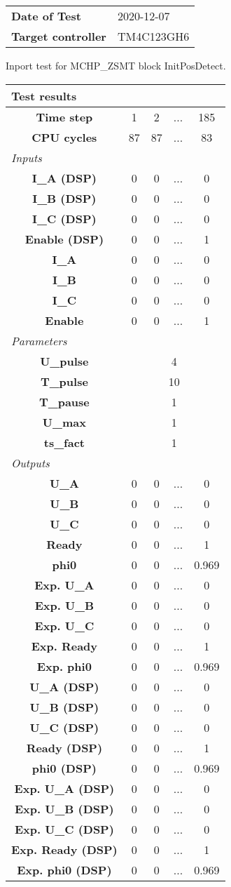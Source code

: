 \begin{tabular}{l l}
\textbf{Date of Test} & 2020-12-07 \tabularnewline
\textbf{Target controller} & TM4C123GH6 \tabularnewline
\end{tabular}
\vspace{1ex}
Inport test for MCHP_ZSMT block InitPosDetect.

\vspace{1em}
\begin{tabularx}{\textwidth}{|c|c|c|>{\centering\arraybackslash}X|c|}
\hline
\multicolumn{5}{|l|}{\cellcolor[gray]{0.8}\textbf{Test results}} \tabularnewline \hline
\textbf{Time step} & 1 & 2 & ... & 185 \tabularnewline \hline
\textbf{CPU cycles} & 87 & 87 & ... & 83 \tabularnewline \hline
\multicolumn{5}{|l|}{\cellcolor[gray]{0.9}\textit{Inputs}} \tabularnewline \hline
\textbf{I\_A (DSP)} & 0 & 0 & ... & 0 \tabularnewline \hline
\textbf{I\_B (DSP)} & 0 & 0 & ... & 0 \tabularnewline \hline
\textbf{I\_C (DSP)} & 0 & 0 & ... & 0 \tabularnewline \hline
\textbf{Enable (DSP)} & 0 & 0 & ... & 1 \tabularnewline \hline
\textbf{I\_A} & 0 & 0 & ... & 0 \tabularnewline \hline
\textbf{I\_B} & 0 & 0 & ... & 0 \tabularnewline \hline
\textbf{I\_C} & 0 & 0 & ... & 0 \tabularnewline \hline
\textbf{Enable} & 0 & 0 & ... & 1 \tabularnewline \hline
\multicolumn{5}{|l|}{\cellcolor[gray]{0.9}\textit{Parameters}} \tabularnewline \hline
\textbf{U\_pulse} & \multicolumn{4}{c|}{4} \tabularnewline \hline
\textbf{T\_pulse} & \multicolumn{4}{c|}{10} \tabularnewline \hline
\textbf{T\_pause} & \multicolumn{4}{c|}{1} \tabularnewline \hline
\textbf{U\_max} & \multicolumn{4}{c|}{1} \tabularnewline \hline
\textbf{ts\_fact} & \multicolumn{4}{c|}{1} \tabularnewline \hline
\multicolumn{5}{|l|}{\cellcolor[gray]{0.9}\textit{Outputs}} \tabularnewline \hline
\textbf{U\_A} & 0 & 0 & ... & 0 \tabularnewline \hline
\textbf{U\_B} & 0 & 0 & ... & 0 \tabularnewline \hline
\textbf{U\_C} & 0 & 0 & ... & 0 \tabularnewline \hline
\textbf{Ready} & 0 & 0 & ... & 1 \tabularnewline \hline
\textbf{phi0} & 0 & 0 & ... & 0.969 \tabularnewline \hline
\textbf{Exp. U\_A} & 0 & 0 & ... & 0 \tabularnewline \hline
\textbf{Exp. U\_B} & 0 & 0 & ... & 0 \tabularnewline \hline
\textbf{Exp. U\_C} & 0 & 0 & ... & 0 \tabularnewline \hline
\textbf{Exp. Ready} & 0 & 0 & ... & 1 \tabularnewline \hline
\textbf{Exp. phi0} & 0 & 0 & ... & 0.969 \tabularnewline \hline
\textbf{U\_A (DSP)} & 0 & 0 & ... & 0 \tabularnewline \hline
\textbf{U\_B (DSP)} & 0 & 0 & ... & 0 \tabularnewline \hline
\textbf{U\_C (DSP)} & 0 & 0 & ... & 0 \tabularnewline \hline
\textbf{Ready (DSP)} & 0 & 0 & ... & 1 \tabularnewline \hline
\textbf{phi0 (DSP)} & 0 & 0 & ... & 0.969 \tabularnewline \hline
\textbf{Exp. U\_A (DSP)} & 0 & 0 & ... & 0 \tabularnewline \hline
\textbf{Exp. U\_B (DSP)} & 0 & 0 & ... & 0 \tabularnewline \hline
\textbf{Exp. U\_C (DSP)} & 0 & 0 & ... & 0 \tabularnewline \hline
\textbf{Exp. Ready (DSP)} & 0 & 0 & ... & 1 \tabularnewline \hline
\textbf{Exp. phi0 (DSP)} & 0 & 0 & ... & 0.969 \tabularnewline \hline
\end{tabularx}
\vspace{1ex}

